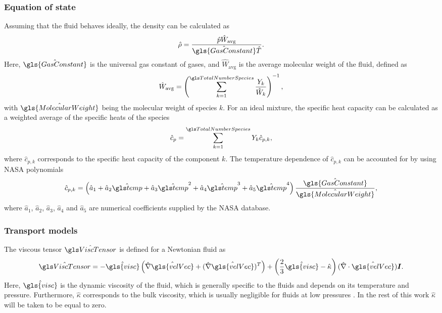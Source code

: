 \subsubsection{Equation of state}
Assuming that the fluid behaves ideally, the density can be calculated as
\begin{equation}
	\hat \rho = \frac{\hat{p}  \hat{W}_{\text{avg}}}{\hat{\gls{GasConstant}} \hat{T} }. \label{eq:IdealGassDimensional}
\end{equation}
Here, $\hat{\gls{GasConstant}}$ is the universal gas constant of gases, and $\hat W_{\text{avg}}$ is the average molecular weight of the fluid, defined as
\begin{equation}
	\hat W_{\text{avg}} = \left( \SumOvAllns \frac{Y_k}{\hat W_k} \right)^{-1},
\end{equation}
with $\hat{\gls{MolecularWeight}}$ being the molecular weight of species $k$.  For an ideal mixture, the specific heat capacity can be calculated as a weighted average of the specific heats of the species 
\begin{equation}
	\hat c_p = \SumOvAllns Y_k \hat{c}_{p,k},%
\end{equation}
where $\hat{c}_{p,k}$ corresponds to the specific heat capacity of the component $k$. The temperature dependence of $\hat{c}_{p,k}$ can be accounted for by using NASA polynomials \parencite{mcbrideNASAThermodynamicData1993}
\begin{equation}
	\hat{c}_{p,k} = \left(\hat a_1 + \hat  a_2\glsHat{temp} +\hat  a_3\glsHat{temp}^2 +\hat  a_4\glsHat{temp}^3+\hat a_5\glsHat{temp}^4\right)\frac{\hat{\gls{GasConstant}}}{\hat{\gls{MolecularWeight}}},
\end{equation}
where $\hat a_1$, $\hat a_2$, $\hat a_3$, $\hat a_4$ and $\hat a_5$ are numerical coefficients supplied by the NASA database.
\subsubsection{Transport models}
The viscous tensor $\glsHat{ViscTensor}$ is defined for a Newtonian fluid as
\begin{equation}
	\glsHat{ViscTensor}= -\hat{\gls{visc}}\left( \hat\nabla \hat{\gls{velVec}} +(\hat\nabla\hat{\gls{velVec}})^T\right)  + \left(\frac{2}{3}\hat{\gls{visc}} - \hat \kappa \right) (\hat\nabla\cdot \hat{\gls{velVec}})\mytensor{I}.
\end{equation}
Here, $\hat{\gls{visc}}$ is the dynamic viscosity of the fluid, which is generally specific to the fluids and depends on its temperature and pressure. Furthermore, $\hat \kappa$ corresponds to the bulk viscosity, which is usually negligible for fluids at low pressures \parencite{birdTransportPhenomena1960}. In the rest of this work $\hat \kappa$ will be taken to be equal to zero.

